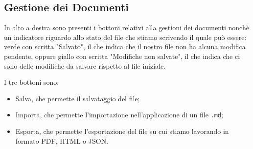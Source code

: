 \subsection{Gestione dei Documenti}
In alto a destra sono presenti i bottoni relativi alla gestioni dei documenti nonchè 
un indicatore riguardo allo stato del file che stiamo scrivendo il quale può essere: verde 
con scritta "Salvato", il che indica che il nostro file non ha alcuna modifica pendente, oppure giallo con scritta 
"Modifiche non salvate", il che indica che ci sono delle modifiche da salvare rispetto al file iniziale.

I tre bottoni sono:
\begin{itemize}
    \item Salva, che permette il salvataggio del file;
    \item Importa, che permette l'importazione nell'applicazione di un file \texttt{.md};
    \item Esporta, che permette l'esportazione del file su cui stiamo lavorando in formato PDF, HTML o JSON.
\end{itemize}